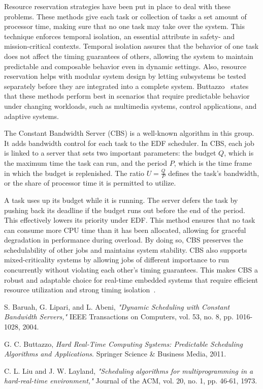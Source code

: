 \documentclass[conference]{IEEEtran}
\begin{document}
Resource reservation strategies have been put in place to deal with these problems. These methods give each task or collection of tasks a set amount of processor time, making sure that no one task may take over the system. This technique enforces temporal isolation, an essential attribute in safety- and mission-critical contexts. Temporal isolation assures that the behavior of one task does not affect the timing guarantees of others, allowing the system to maintain predictable and composable behavior even in dynamic settings. Also, resource reservation helps with modular system design by letting subsystems be tested separately before they are integrated into a complete system. Buttazzo~\cite{buttazzo2011hard} states that these methods perform best in scenarios that require predictable behavior under changing workloads, such as multimedia systems, control applications, and adaptive systems.

The Constant Bandwidth Server (CBS) is a well-known algorithm in this group. It adds bandwidth control for each task to the EDF scheduler. In CBS, each job is linked to a server that sets two important parameters: the budget $Q$, which is the maximum time the task can run, and the period $P$, which is the time frame in which the budget is replenished. The ratio $U = \frac{Q}{P}$ defines the task’s bandwidth, or the share of processor time it is permitted to utilize.

A task uses up its budget while it is running. The server defers the task by pushing back its deadline if the budget runs out before the end of the period. This effectively lowers its priority under EDF. This method ensures that no task can consume more CPU time than it has been allocated, allowing for graceful degradation in performance during overload. By doing so, CBS preserves the schedulability of other jobs and maintains system stability. CBS also supports mixed-criticality systems by allowing jobs of different importance to run concurrently without violating each other's timing guarantees. This makes CBS a robust and adaptable choice for real-time embedded systems that require efficient resource utilization and strong timing isolation~\cite{baruah2004dynamic}.



\begin{thebibliography}{9}

S. Baruah, G. Lipari, and L. Abeni, \textit{"Dynamic Scheduling with Constant Bandwidth Servers,"} IEEE Transactions on Computers, vol. 53, no. 8, pp. 1016-1028, 2004.

G. C. Buttazzo, \textit{Hard Real-Time Computing Systems: Predictable Scheduling Algorithms and Applications}. Springer Science \& Business Media, 2011.

C. L. Liu and J. W. Layland, \textit{"Scheduling algorithms for multiprogramming in a hard-real-time environment,"} Journal of the ACM, vol. 20, no. 1, pp. 46-61, 1973.

\end{thebibliography}
\end{document}
